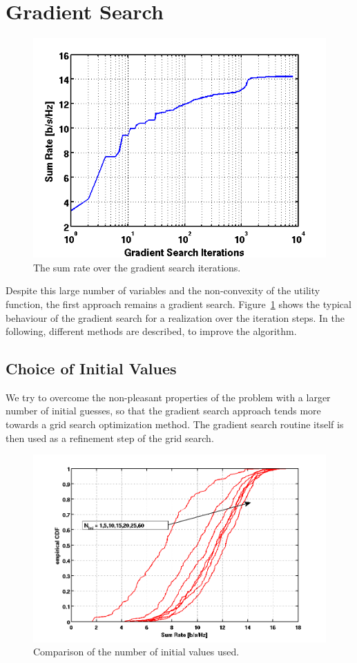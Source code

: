 \section{Gradient Search}
\label{sec:grads_solver}

\begin{figure}
\centering
  \includegraphics[width=0.5\linewidth]{images/rvsgradCnt_7rel_18dB_6.png}
\caption{The sum rate over the gradient search iterations.}
\label{fig:grad_search}
\end{figure}
Despite this large number of variables and the non-convexity of the utility function, the first approach remains a gradient search.
Figure~\ref{fig:grad_search} shows the typical behaviour of the gradient search for a realization over the iteration steps.
In the following, different methods are described, to improve the algorithm.

\subsection{Choice of Initial Values}
\label{sec:grads_ini}
We try to overcome the non-pleasant properties of the problem with a larger number of initial guesses, so that the gradient search approach tends more towards a grid search optimization method.
The gradient search routine itself is then used as a refinement step of the grid search.
\begin{figure}[h]
\centering
  \includegraphics[width=0.85\linewidth]{images/Inicomparison_edited.png}
\caption{Comparison of the number of initial values used.}
\label{fig:ini_comp}
\end{figure}


